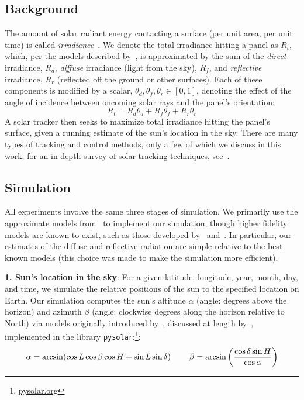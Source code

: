 \documentclass[11pt]{article}
\begin{document}
\subsection{Background}
The amount of solar radiant energy contacting a surface (per unit area, per unit time) is called {\it irradiance}~\cite{goswami2000principles}.  We denote the total irradiance hitting a panel as $R_t$, which, per the models described by~\citet{kamali2006estimating}, is approximated by the sum of the {\it direct} irradiance, $R_d$, {\it diffuse} irradiance (light from the sky), $R_f$, and {\it reflective} irradiance, $R_r$ (reflected off the ground or other surfaces). Each of these components is modified by a scalar, $\theta_d, \theta_f, \theta_r \in [0,1]$, denoting the effect of the angle of incidence between oncoming solar rays and the panel's orientation:
\begin{equation}
R_t = R_d \theta_d + R_f \theta_f + R_r \theta_r
\label{eq:total_rads}
\end{equation}
A solar tracker then seeks to maximize total irradiance hitting the panel's surface, given a running estimate of the sun's location in the sky. There are many types of tracking and control methods, only a few of which we discuss in this work; for an in depth survey of solar tracking techniques, see~\citet{mousazadeh2009review}.

\subsection{Simulation}
All experiments involve the same three stages of simulation. We primarily use the approximate models from~\citet{masters2013renewable} to implement our simulation, though higher fidelity models are known to exist, such as those developed by~\citet{andersen1980comments,klein1977calculation} and~\citet{kamali2006estimating}. In particular, our estimates of the diffuse and reflective radiation are simple relative to the best known models (this choice was made to make the simulation more efficient).

{\bf 1. Sun's location in the sky}: For a given latitude, longitude, year, month, day, and time, we simulate the relative positions of the sun to the specified location on Earth. Our simulation computes the sun's altitude $\alpha$ (angle: degrees above the horizon) and azimuth $\beta$ (angle: clockwise degrees along the horizon relative to North) via models originally introduced by~\citet{jordan1958chafer}, discussed at length by~\citet{masters2013renewable}, implemented in the library \texttt{pysolar}:\footnote{\url{pysolar.org}}:
\begin{equation}
\alpha = \arcsin(\cos L \cos \beta \cos H + \sin L \sin \delta) \hspace{8mm} \beta = \arcsin\left(\frac{\cos \delta \sin H}{\cos \alpha}\right)
\end{equation}
\end{document}
